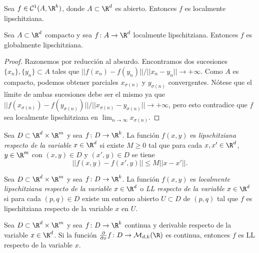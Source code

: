 \documentclass{article}
\begin{document}
\begin{corollary}
  Sea $f \in \mathcal{C}^1(A, \R^k)$, donde $A \subset \R^d$ es abierto. Entonces $f$ es localmente
  lipschitziana.
\end{corollary}

\begin{lemma} \label{lem:compacto-lipschitziana}
  Sea $A \subset \R^d$ compacto y sea $f \colon A \to \R^d$ localmente
  lipschitziana. Entonces $f$ es globalmente lipschitziana.
\end{lemma}
\begin{proof}
  Razonemos por reducción al absurdo. Encontramos dos sucesiones
  $\{x_n\}, \{y_n\} \subset A$ tales que $||f(x_n) - f(y_n)|| / || x_n - y_n|| \to +\infty$.  Como
  $A$ es compacto, podemos obtener parciales $x_{\sigma(n)}$ y $y_{\sigma(n)}$ convergentes. Nótese
  que el límite de ambas sucesiones debe ser el mismo ya que
  $||f(x_{\sigma(n)}) - f(y_{\sigma(n)})|| / || x_{\sigma(n)} - y_{\sigma(n)}|| \to +\infty$, pero
  esto contradice que $f$ sea localmente lipschitziana en $\lim_{n \to \infty} x_{\sigma(n)}$.
\end{proof}


\begin{definition}
  Sea $D \subset \R^d \times \R^m$ y sea $f \colon D \to \R^k$. La función $f(x,y)$ es
  \emph{lipschitziana respecto de la variable} $x \in \R^d$ si existe $M \ge 0$ tal que para cada
  $x,x' \in \R^d$, $y \in \R^m$ con $(x,y) \in D$ y $(x', y) \in D$ se tiene
  \[ ||f(x,y)-f(x',y)|| \le M ||x-x'||. \]
\end{definition}

\begin{definition}
  Sea $D \subset \R^d \times \R^m$ y sea $f \colon D \to \R^k$. La función $f(x,y)$ es
  \emph{localmente lipschitziana respecto de la variable} $x \in \R^d$ o \emph{LL respecto de la
    variable} $x \in \R^d$ si para cada $(p,q) \in D$ existe un entorno abierto $U \subset D$ de
  $(p,q)$ tal que $f$ es lipschitziana respecto de la variable $x$ en $U$.
\end{definition}

\begin{proposition}
  Sea $D \subset \R^d \times \R^m$ y sea $f \colon D \to \R^k$ continua y derivable respecto de la
  variable $x \in \R^{d}$. Si la función
  $\frac{\partial}{\partial x}f \colon D \to \mathcal{M}_{d,k}(\R)$ es continua, entonces $f$ es LL
  respecto de la variable $x$.
\end{proposition}
\end{document}
